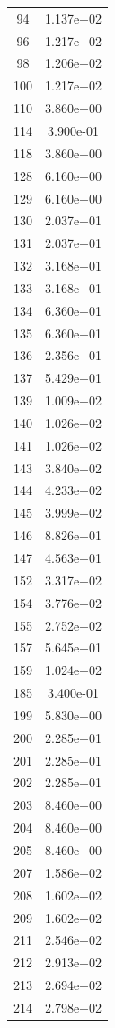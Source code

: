 \documentclass[12pt]{article}
\begin{document}
\begin{longtable}{@{}cc@{}}
94 & 1.137e+02 \\
96 & 1.217e+02 \\
98 & 1.206e+02 \\
100 & 1.217e+02 \\
110 & 3.860e+00 \\
114 & 3.900e-01 \\
118 & 3.860e+00 \\
128 & 6.160e+00 \\
129 & 6.160e+00 \\
130 & 2.037e+01 \\
131 & 2.037e+01 \\
132 & 3.168e+01 \\
133 & 3.168e+01 \\
134 & 6.360e+01 \\
135 & 6.360e+01 \\
136 & 2.356e+01 \\
137 & 5.429e+01 \\
139 & 1.009e+02 \\
140 & 1.026e+02 \\
141 & 1.026e+02 \\
143 & 3.840e+02 \\
144 & 4.233e+02 \\
145 & 3.999e+02 \\
146 & 8.826e+01 \\
147 & 4.563e+01 \\
152 & 3.317e+02 \\
154 & 3.776e+02 \\
155 & 2.752e+02 \\
157 & 5.645e+01 \\
159 & 1.024e+02 \\
185 & 3.400e-01 \\
199 & 5.830e+00 \\
200 & 2.285e+01 \\
201 & 2.285e+01 \\
202 & 2.285e+01 \\
203 & 8.460e+00 \\
204 & 8.460e+00 \\
205 & 8.460e+00 \\
207 & 1.586e+02 \\
208 & 1.602e+02 \\
209 & 1.602e+02 \\
211 & 2.546e+02 \\
212 & 2.913e+02 \\
213 & 2.694e+02 \\
214 & 2.798e+02 \\

\end{longtable}
\end{document}
